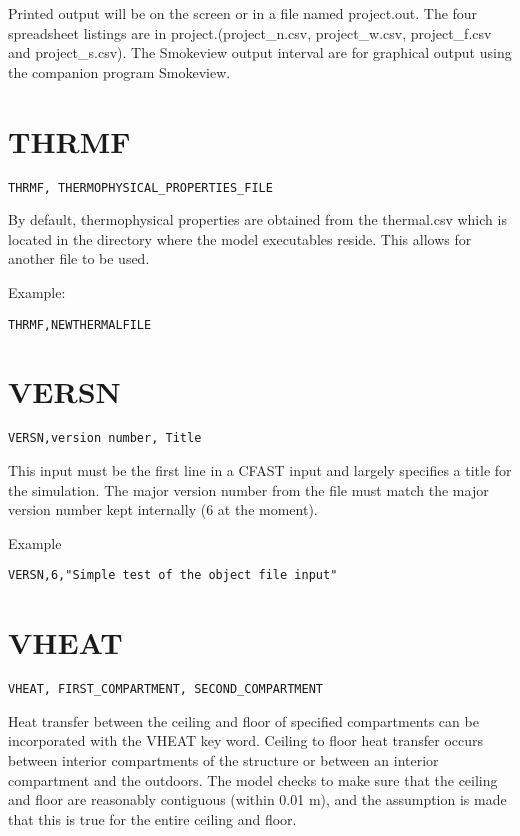 Printed output will be on the screen or in a file named project.out. The four spreadsheet listings are in project.(project\_n.csv, project\_w.csv, project\_f.csv and project\_s.csv). The Smokeview output interval are for graphical output using the companion program Smokeview.

\section{THRMF}

\begin{lstlisting}
THRMF, THERMOPHYSICAL_PROPERTIES_FILE
\end{lstlisting}

By default, thermophysical properties are obtained from the thermal.csv which is located in the directory where the model executables reside. This allows for another file to be used.

Example:

\begin{lstlisting}
THRMF,NEWTHERMALFILE
\end{lstlisting}

\section{VERSN}

\begin{lstlisting}
VERSN,version number, Title
\end{lstlisting}

This input must be the first line in a CFAST input and largely specifies a title for the simulation. The major version number from the file must match the major version number kept internally (6 at the moment).

Example

\begin{lstlisting}
VERSN,6,"Simple test of the object file input"
\end{lstlisting}

\section{VHEAT}

\begin{lstlisting}
VHEAT, FIRST_COMPARTMENT, SECOND_COMPARTMENT
\end{lstlisting}

Heat transfer between the ceiling and floor of specified compartments can be incorporated with the VHEAT key word. Ceiling to floor heat transfer occurs between interior compartments of the structure or between an interior compartment and the outdoors. The model checks to make sure that the ceiling and floor are reasonably contiguous (within 0.01 m), and the assumption is made that this is true for the entire ceiling and floor.

